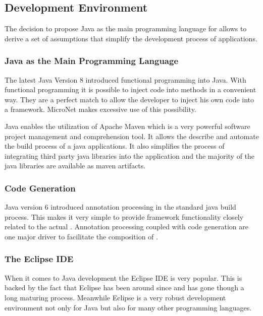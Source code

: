 \subsection{Development Environment}

The decision to propose Java as the main programming language for \mss{} allows
to derive a set of assumptions that simplify the development process of \ms{}
applications.

\subsubsection{Java as the Main Programming Language}

The latest Java Version 8 introduced functional programming into Java. With
functional programming it is possible to inject code into methods in a
convenient way. They are a perfect match to allow the developer to inject his
own code into a framework. MicroNet makes excessive use of this possibility.

Java enables the utilization of Apache Maven which is a very powerful software
project management and comprehension tool. It allows the describe and automate
the build process of a java applications. It also simplifies the process of
integrating third party java libraries into the application and the majority of
the java libraries are available as maven artifacts.

\subsubsection{Code Generation}

Java version 6 introduced annotation processing in the standard java build
process. This makes it very simple to provide framework functionality closely
related to the actual \og{}. Annotation processing coupled with code generation
are one major driver to facilitate the composition of \mss{}.

\subsubsection{The Eclipse IDE}

When it comes to Java development the Eclipse IDE is very popular. This is
backed by the fact that Eclipse has been around since  and has gone
though a long maturing process. Meanwhile Eclipse is a very robust development
environment not only for Java but also for many other programming languages. 

